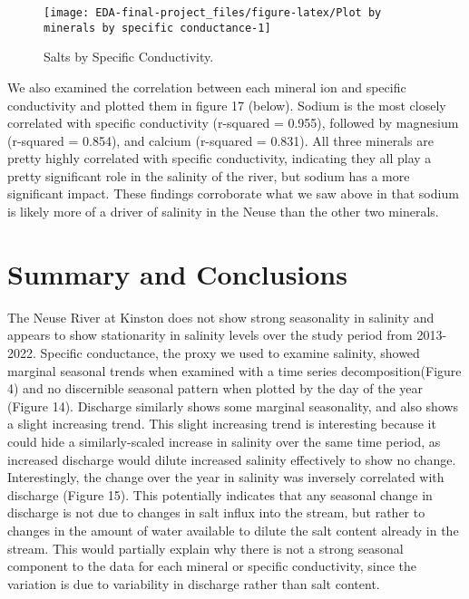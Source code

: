 \documentclass[
  12pt,
]{article}
\begin{document}
\begin{figure}

{\centering \texttt{[image: EDA-final-project\_files/figure-latex/Plot by minerals by specific conductance-1]} 

}

\caption{Salts by Specific Conductivity.}\label{fig:Plot by minerals by specific conductance}
\end{figure}

We also examined the correlation between each mineral ion and specific
conductivity and plotted them in figure 17 (below). Sodium is the most
closely correlated with specific conductivity (r-squared = 0.955),
followed by magnesium (r-squared = 0.854), and calcium (r-squared =
0.831). All three minerals are pretty highly correlated with specific
conductivity, indicating they all play a pretty significant role in the
salinity of the river, but sodium has a more significant impact. These
findings corroborate what we saw above in that sodium is likely more of
a driver of salinity in the Neuse than the other two minerals.

\newpage

\hypertarget{summary-and-conclusions}{%
\section{Summary and Conclusions}\label{summary-and-conclusions}}

The Neuse River at Kinston does not show strong seasonality in salinity
and appears to show stationarity in salinity levels over the study
period from 2013-2022. Specific conductance, the proxy we used to
examine salinity, showed marginal seasonal trends when examined with a
time series decomposition(Figure 4) and no discernible seasonal pattern
when plotted by the day of the year (Figure 14). Discharge similarly
shows some marginal seasonality, and also shows a slight increasing
trend. This slight increasing trend is interesting because it could hide
a similarly-scaled increase in salinity over the same time period, as
increased discharge would dilute increased salinity effectively to show
no change. Interestingly, the change over the year in salinity was
inversely correlated with discharge (Figure 15). This potentially
indicates that any seasonal change in discharge is not due to changes in
salt influx into the stream, but rather to changes in the amount of
water available to dilute the salt content already in the stream. This
would partially explain why there is not a strong seasonal component to
the data for each mineral or specific conductivity, since the variation
is due to variability in discharge rather than salt content.
\end{document}
